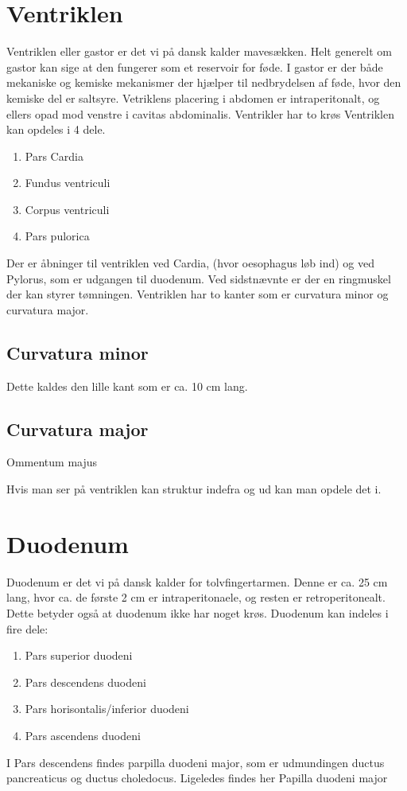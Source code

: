 	 
	 
	\section{Ventriklen}
	Ventriklen eller gastor er det vi på dansk kalder mavesækken. Helt generelt om gastor kan sige at den fungerer som et reservoir for føde. I gastor er der både mekaniske og kemiske mekanismer der hjælper til nedbrydelsen af føde, hvor den kemiske del er saltsyre. Vetriklens placering i abdomen er intraperitonalt, og ellers opad mod venstre i cavitas abdominalis. Ventrikler har to krøs Ventriklen kan opdeles i 4 dele. 
	\begin{enumerate}
		\item Pars Cardia
		\item Fundus ventriculi
		\item Corpus ventriculi
		\item Pars pulorica
	\end{enumerate}
	Der er åbninger til ventriklen ved Cardia, (hvor oesophagus løb ind) og ved Pylorus, som er udgangen til duodenum. Ved sidstnævnte er der en ringmuskel der kan styrer tømningen. Ventriklen har to kanter som er curvatura minor og curvatura major. 
	
	\subsection{Curvatura minor}
	Dette kaldes den lille kant som er ca. 10 cm lang. 
	\subsection{Curvatura major}
	
	Ommentum majus
	
	
	Hvis man ser på ventriklen kan struktur indefra og ud kan man opdele det i. 
	
	\section{Duodenum}
	Duodenum er det vi på dansk kalder for tolvfingertarmen. Denne er ca. 25 cm lang, hvor ca. de første 2 cm er intraperitonaele, og resten er retroperitonealt. Dette betyder også at duodenum ikke har noget krøs. Duodenum kan indeles i fire dele:
	\begin{enumerate}
		\item Pars superior duodeni
		\item Pars descendens duodeni
		\item Pars horisontalis/inferior duodeni
		\item Pars ascendens duodeni
	\end{enumerate}
	
	I Pars descendens findes parpilla duodeni major, som er udmundingen ductus pancreaticus og ductus choledocus. Ligeledes findes her Papilla duodeni major
	
	\pagebreak
	
